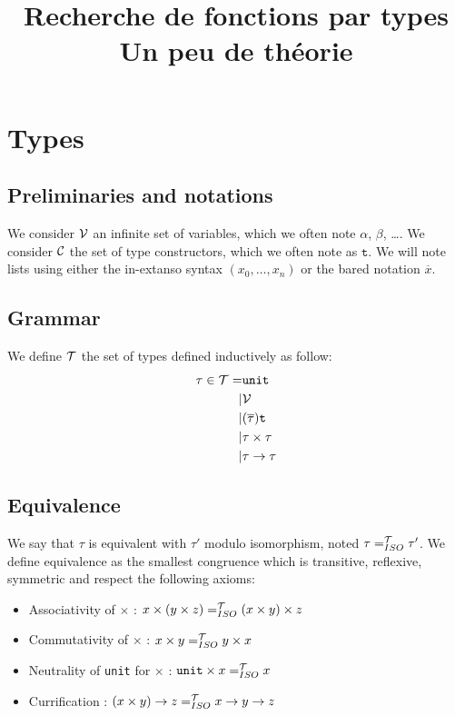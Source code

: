 \documentclass [a4paper,11pt]{scrartcl}
\title{
  Recherche de fonctions par types \\[0.5em]
  \large Un peu de théorie
}
\date{}
\newcommand{\Var}{{\cal V}}
\newcommand{\Constr}{{\cal C}}
\newcommand{\tconstr}{\texttt{t}}
\newcommand{\T}{{\cal T}}
\newcommand\tprod{\times}
\newcommand\tlist{\overline}
\begin{document}
\maketitle


\section{Types}

\subsection{Preliminaries and notations}

We consider $\Var$ an infinite set of variables, which we often note $\alpha$, $\beta$, \dots.
We consider $\Constr$ the set of type constructors, which we often note as $\tconstr$.
We will note lists using either the in-extanso syntax $(x_0,\dots,x_n)$ or the
bared notation $\tlist{x}$.


\subsection{Grammar}

We define $\T$ the set of types defined inductively
as follow:
\begin{align*}
  \tau \in \T
  =& \texttt{unit}\\
  |& \Var\\
  |& (\tlist\tau) \tconstr\\
  |& \tau \tprod \tau\\
  |& \tau \to \tau  
\end{align*}

\subsection{Equivalence}

\newcommand\eqT{=^{\T}_{ISO}}

We say that $\tau$ is equivalent with $\tau'$ modulo isomorphism,
noted $\tau \eqT \tau'$. We define
equivalence as the smallest congruence which is transitive, reflexive, symmetric and respect the following axioms:

\begin{itemize}
\item Associativity of $\tprod$ : $x \tprod (y \tprod z) \eqT (x \tprod y) \tprod z$
\item Commutativity of $\tprod$ : $x \tprod y \eqT y \tprod x$
\item Neutrality of \texttt{unit} for $\tprod$ : $\texttt{unit} \tprod x \eqT x$ 
\item Currification : $(x \tprod y) \to z \eqT x \to y \to z$
\end{itemize}
\end{document}

